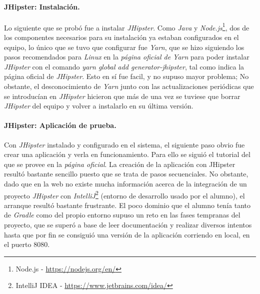 \par
\paragraph*{JHipster: Instalación.}

\par
Lo siguiente que se probó fue a instalar \textit{JHipster}. Como \textit{Java} y \textit{Node.js}\footnote{Node.js \textregistered - \url{https://nodejs.org/en/}}, dos de los componentes necesarios para su instalación ya estaban configurados en el equipo, lo único que se tuvo que configurar fue \textit{Yarn}, que se hizo siguiendo los pasos recomendados para \textit{Linux} en la \textit{página oficial de Yarn} \cite{yarninstall} para poder instalar \textit{JHipster} con el comando \textit{yarn global add generator-jhipster}, tal como indica la página oficial de \textit{JHipster}. Esto en sí fue facil, y no supuso mayor problema; No obstante, el desconocimiento de \textit{Yarn} junto con las actualizaciones periódicas que se introducían en \textit{JHipster} hicieron que más de una vez se tuviese que borrar \textit{JHipster} del equipo y volver a instalarlo en su última versión.  


\par
\paragraph*{JHipster: Aplicación de prueba.}

\par
Con \textit{JHipster} instalado y configurado en el sistema, el siguiente paso obvio fue crear una aplicación y verla en funcionamiento. Para ello se siguió el tutorial del que se provee en la \textit{página oficial}. La creación de la aplicación con JHipster resultó bastante sencillo puesto que se trata de pasos secuenciales. No obstante, dado que en la web no existe mucha información acerca de la integración de un proyecto  \textit{JHipster} con \textit{IntelliJ}\footnote{IntelliJ IDEA - \url{https://www.jetbrains.com/idea/}} (entorno de desarrollo usado por el alumno), el arranque resultó bastante frustrante. El poco dominio que el alumno tenía tanto de \textit{Gradle} como del propio entorno supuso un reto en las fases tempranas del proyecto, que se superó a base de leer documentación y realizar diversos intentos hasta que por fin se consiguió una versión de la aplicación corriendo en local, en el puerto 8080. 


\par
